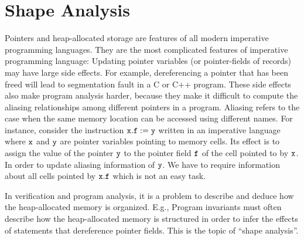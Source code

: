 \chapter{Shape Analysis}
Pointers and heap-allocated storage are features of all modern imperative programming languages.
They are the most complicated features of imperative programming language:
Updating  pointer variables (or pointer-fields of records) may have large side effects.
For example, dereferencing a pointer that has been freed will lead to segmentation fault in a C or C++ program.
%
These side effects also make program analysis harder, because they make it
difficult to compute the aliasing relationships among different pointers in a program. Aliasing refers to the case when the same memory location can be accessed using different names.
For instance, consider the instruction $\tt x.f := y$ written in an imperative language where $\tt x$ and $\tt y$ are pointer variables pointing to memory cells. Its effect is to assign the value of the pointer $\tt y$ to the pointer field $\tt f$ of the cell pointed to by $\tt x$. In order to update aliasing information of $\tt y$. We have to require information about all cells pointed by $\tt x.f$ which is not an easy task.

In verification and program analysis, it is a problem to describe and deduce how the heap-allocated memory is organized. E.g., Program invariants must often describe how the heap-allocated memory is structured in order to infer the effects of statements that dereference pointer fields. This is the topic of ``shape analysis''.


